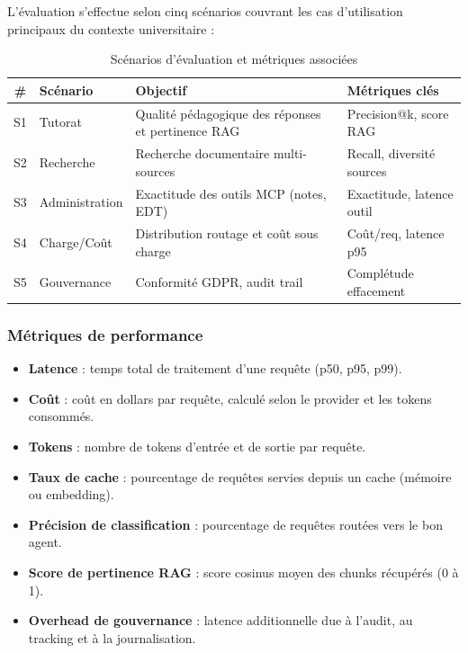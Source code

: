 \documentclass[12pt, a4paper]{article}
\begin{document}
L'évaluation s'effectue selon cinq scénarios couvrant les cas d'utilisation principaux du contexte universitaire :

\begin{table}[H]
\centering
\caption{Scénarios d'évaluation et métriques associées}
\label{tab:scenarios}
\small
\begin{tabularx}{\textwidth}{c l X l}
\toprule
\textbf{\#} & \textbf{Scénario} & \textbf{Objectif} & \textbf{Métriques clés} \\
\midrule
S1 & Tutorat & Qualité pédagogique des réponses et pertinence RAG & Precision@k, score RAG \\
S2 & Recherche & Recherche documentaire multi-sources & Recall, diversité sources \\
S3 & Administration & Exactitude des outils MCP (notes, EDT) & Exactitude, latence outil \\
S4 & Charge/Coût & Distribution routage et coût sous charge & Coût/req, latence p95 \\
S5 & Gouvernance & Conformité GDPR, audit trail & Complétude effacement \\
\bottomrule
\end{tabularx}
\end{table}

\subsubsection{Métriques de performance}

\begin{itemize}
  \item \textbf{Latence} : temps total de traitement d'une requête (p50, p95, p99).
  \item \textbf{Coût} : coût en dollars par requête, calculé selon le provider et les tokens consommés.
  \item \textbf{Tokens} : nombre de tokens d'entrée et de sortie par requête.
  \item \textbf{Taux de cache} : pourcentage de requêtes servies depuis un cache (mémoire ou embedding).
  \item \textbf{Précision de classification} : pourcentage de requêtes routées vers le bon agent.
  \item \textbf{Score de pertinence RAG} : score cosinus moyen des chunks récupérés (0 à 1).
  \item \textbf{Overhead de gouvernance} : latence additionnelle due à l'audit, au tracking et à la journalisation.
\end{itemize}
\end{document}
